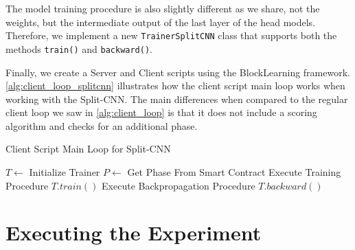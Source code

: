 The model training procedure is also slightly different as we share, not the weights, but the intermediate output of the last layer of the head models. Therefore, we implement a new \texttt{TrainerSplitCNN} class that supports both the methods \texttt{train()} and \texttt{backward()}.

Finally, we create a Server and Client scripts using the BlockLearning framework. \autoref{alg:client_loop_splitcnn} illustrates how the client script main loop works when working with the Split-CNN. The main differences when compared to the regular client loop we saw in \autoref{alg:client_loop} is that it does not include a scoring algorithm and checks for an additional phase.

\begin{algorithm}
\caption{Client Script Main Loop for Split-CNN}\label{alg:client_loop_splitcnn}
\begin{algorithmic}
\State $T \gets $ Initialize Trainer
    \State $P \gets$ Get Phase From Smart Contract
        \State Execute Training Procedure $T.train()$
        \State Execute Backpropagation Procedure $T.backward()$
    \EndIf
\EndWhile
\end{algorithmic}
\end{algorithm}

\section{Executing the Experiment}




